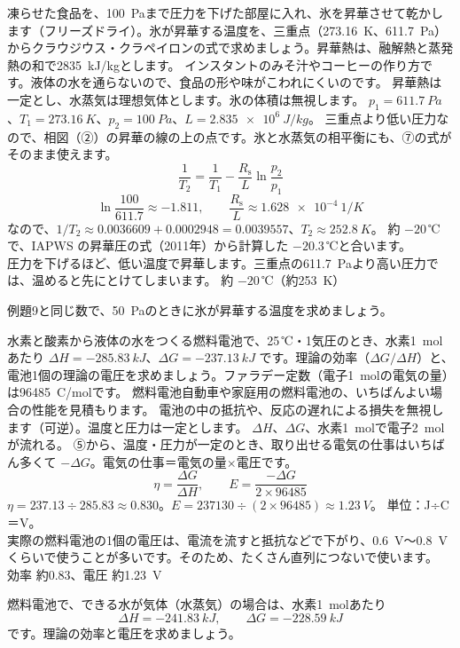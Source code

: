 \label{ph:熱-10:ex9}
\begin{phreidai}
凍らせた食品を、\qty{100}{Pa}まで圧力を下げた部屋に入れ、氷を昇華させて乾かします（フリーズドライ）。氷が昇華する温度を、三重点（\qty{273.16}{K}、\qty{611.7}{Pa}）からクラウジウス・クラペイロンの式で求めましょう。昇華熱は、融解熱と蒸発熱の和で\qty{2835}{kJ/kg}とします。
\phbamen
インスタントのみそ汁やコーヒーの作り方です。液体の水を通らないので、食品の形や味がこわれにくいのです。
\phmushi
昇華熱は一定とし、水蒸気は理想気体とします。氷の体積は無視します。
\phzu
$p_1=\qty{611.7}{Pa}$、$T_1=\qty{273.16}{K}$、$p_2=\qty{100}{Pa}$、$L=\qty{2.835e6}{J/kg}$。
\phriyu
三重点より低い圧力なので、相図（②）の昇華の線の上の点です。氷と水蒸気の相平衡にも、⑦の式がそのまま使えます。
\phtateru
\[\frac{1}{T_2}=\frac{1}{T_1}-\frac{R_{\mathrm s}}{L}\ln\frac{p_2}{p_1}\]
\phtoku
\[\ln\frac{100}{611.7}\approx-1.811,\qquad\frac{R_{\mathrm s}}{L}\approx\qty{1.628e-4}{1/K}\]
なので、$1/T_2\approx0.0036609+0.0002948=0.0039557$、$T_2\approx\qty{252.8}{K}$。
\phtashikame
約 $-20$\,℃で、IAPWS の昇華圧の式（2011年）から計算した $-20.3$\,℃と合います。\\
圧力を下げるほど、低い温度で昇華します。三重点の\qty{611.7}{Pa}より高い圧力では、温めると先にとけてしまいます。
\kotae 約 $-20$\,℃（約\qty{253}{K}）
\end{phreidai}
\begin{jibun}
例題9と同じ数で、\qty{50}{Pa}のときに氷が昇華する温度を求めましょう。
\end{jibun}

\label{ph:熱-10:ex10}
\begin{phreidai}
水素と酸素から液体の水をつくる燃料電池で、25\,℃・1気圧のとき、水素\qty{1}{mol}あたり $\Delta H=\qty{-285.83}{kJ}$、$\Delta G=\qty{-237.13}{kJ}$ です。理論の効率（$\Delta G/\Delta H$）と、電池1個の理論の電圧を求めましょう。ファラデー定数（電子\qty{1}{mol}の電気の量）は\qty{96485}{C/mol}です。
\phbamen
燃料電池自動車や家庭用の燃料電池の、いちばんよい場合の性能を見積もります。
\phmushi
電池の中の抵抗や、反応の遅れによる損失を無視します（可逆）。温度と圧力は一定とします。
\phzu
$\Delta H$、$\Delta G$、水素\qty{1}{mol}で電子\qty{2}{mol}が流れる。
\phriyu
⑤から、温度・圧力が一定のとき、取り出せる電気の仕事はいちばん多くて $-\Delta G$。電気の仕事＝電気の量×電圧です。
\phtateru
\[\eta=\frac{\Delta G}{\Delta H},\qquad E=\frac{-\Delta G}{2\times96485}\]
\phtoku
$\eta=237.13\div285.83\approx0.830$。$E=237130\div(2\times96485)\approx\qty{1.23}{V}$。
\phtashikame
単位：J÷C＝V。\\
実際の燃料電池の1個の電圧は、電流を流すと抵抗などで下がり、\qty{0.6}{V}〜\qty{0.8}{V}くらいで使うことが多いです。そのため、たくさん直列につないで使います。
\kotae 効率 約0.83、電圧 約\qty{1.23}{V}
\end{phreidai}
\begin{jibun}
燃料電池で、できる水が気体（水蒸気）の場合は、水素\qty{1}{mol}あたり
\[\Delta H=\qty{-241.83}{kJ},\qquad\Delta G=\qty{-228.59}{kJ}\]
です。理論の効率と電圧を求めましょう。
\end{jibun}

